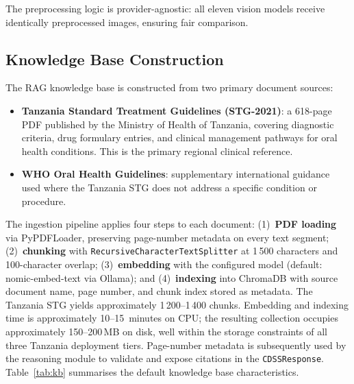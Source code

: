 \documentclass[12pt,a4paper]{report}
\begin{document}
	The preprocessing logic is provider-agnostic: all eleven vision models
	receive identically preprocessed images, ensuring fair comparison.
	
	\subsection{Knowledge Base Construction}
	\label{subsec:kb}
	
	The RAG knowledge base is constructed from two primary document sources:
	
	\begin{itemize}
		\item \textbf{Tanzania Standard Treatment Guidelines (STG-2021)}: a
		618-page PDF published by the Ministry of Health of
		Tanzania, covering diagnostic criteria, drug
		formulary entries, and clinical management pathways for oral
		health conditions.  This is the primary regional clinical
		reference.
		\item \textbf{WHO Oral Health Guidelines}:
		supplementary international guidance used where the Tanzania STG
		does not address a specific condition or procedure.
	\end{itemize}
	
	The ingestion pipeline applies four steps to each document:
	(1)~\textbf{PDF loading} via PyPDFLoader, preserving page-number
	metadata on every text segment; (2)~\textbf{chunking} with
	\texttt{RecursiveCharacterTextSplitter} at 1\,500 characters and
	100-character overlap; (3)~\textbf{embedding} with the configured model
	(default: nomic-embed-text via Ollama); and (4)~\textbf{indexing} into
	ChromaDB with source document name, page number, and chunk index stored
	as metadata.  The Tanzania STG yields approximately 1\,200--1\,400
	chunks.  Embedding and indexing time is approximately 10--15~minutes on
	CPU; the resulting collection occupies approximately 150--200\,MB on
	disk, well within the storage constraints of all three Tanzania
	deployment tiers.  Page-number metadata is subsequently used by the
	reasoning module to validate and expose citations in the
	\texttt{CDSSResponse}.  Table~\ref{tab:kb} summarises the default
	knowledge base characteristics.
	
\end{document}
